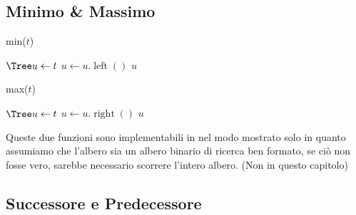     \subsection{Minimo \& Massimo}
        \begin{algorithm}[H]
            \caption{\Tree min(\Tree $ t $)}
            \begin{algorithmic}
                \State $\Tree u \gets t$
                    \State $ u \gets u.\operatorname{left}() $
                \EndWhile
                \State \Return $ u $
            \end{algorithmic}
        \end{algorithm}
        \begin{algorithm}[H]
            \caption{\Tree max(\Tree $ t $)}
            \begin{algorithmic}
                \State $\Tree u \gets t$
                    \State $ u \gets u.\operatorname{right}() $
                \EndWhile
                \State \Return $ u $
            \end{algorithmic}
        \end{algorithm}
        Queste due funzioni sono implementabili in nel modo mostrato solo in quanto assumiamo che l'albero sia un albero binario di ricerca ben formato, se ciò non fosse vero, sarebbe necessario scorrere l'intero albero. (Non in questo capitolo)
    \subsection{Successore e Predecessore}
